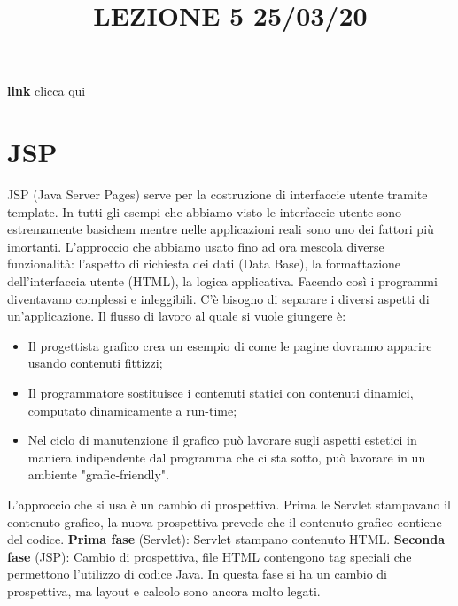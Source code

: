 \title{LEZIONE 5 25/03/20}\newline
\textbf{link} \href{https://web.microsoftstream.com/video/2534f028-dc3d-4987-9905-66f2994ce127}{clicca qui}
\section{JSP}
JSP (Java Server Pages) serve per la costruzione di interfaccie utente tramite template.\newline
\newline
In tutti gli esempi che abbiamo visto le interfaccie utente sono estremamente basichem mentre nelle applicazioni reali sono uno dei fattori più imortanti.\newline
\newline
L'approccio che abbiamo usato fino ad ora mescola diverse funzionalità: l'aspetto di richiesta dei dati (Data Base), la formattazione dell'interfaccia utente (HTML), la logica applicativa. Facendo così i programmi diventavano complessi e inleggibili. C'è bisogno di separare i diversi aspetti di un'applicazione.\newline
Il flusso di lavoro al quale si vuole giungere è:
\begin{itemize}
    \item Il progettista grafico crea un esempio di come le pagine dovranno apparire usando contenuti fittizzi;
    \item Il programmatore sostituisce i contenuti statici con contenuti dinamici, computato dinamicamente a run-time;
    \item Nel ciclo di manutenzione il grafico può lavorare sugli aspetti estetici in maniera indipendente dal programma che ci sta sotto, può lavorare in un ambiente "grafic-friendly".
\end{itemize}
L'approccio che si usa è un cambio di prospettiva. Prima le Servlet stampavano il contenuto grafico, la nuova prospettiva prevede che il contenuto grafico contiene del codice.\newline
\newline
\textbf{Prima fase} (Servlet): Servlet stampano contenuto HTML.\newline
\newline
\textbf{Seconda fase} (JSP): Cambio di prospettiva, file HTML contengono tag speciali che permettono l'utilizzo di codice Java. In questa fase si ha un cambio di prospettiva, ma layout e calcolo sono ancora molto legati.\newline
\newline
